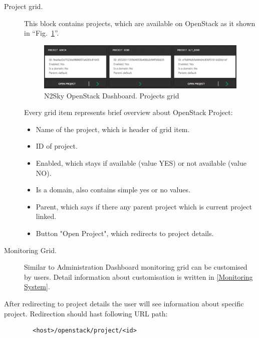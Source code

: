 \begin{description}
\item[Project grid.] This block contains projects, which are available on OpenStack as it shown in ``Fig.~\ref{fig:openstack_dashboard_projects}''.

\begin{figure}[htbp]
\begin{center}
  \includegraphics[width=\linewidth]{components/4/pics/openstack_dashboard_projects.png}
  \caption{N2Sky OpenStack Dashboard. Projects grid}
  \label{fig:openstack_dashboard_projects}
\end{center}
\end{figure}

Every grid item represents brief overview about OpenStack Project:

\begin{itemize}
\item Name of the project, which is header of grid item.
\item ID of project.
\item Enabled, which stays if available (value YES) or not available (value NO).
\item Is a domain, also contains simple yes or no values.
\item Parent, which says if there any parent project which is current project linked.
\item Button "Open Project", which redirects to project details.
\end{itemize}

\item[Monitoring Grid.] Similar to Administration Dashboard monitoring grid can be customised by users. Detail information about customisation is written in \autoref{Monitoring System}. 

\end{description}

After redirecting to project details the user will see information about specific project. Redirection should hast following URL path: 
\begin{lstlisting}
		<host>/openstack/project/<id>
\end{lstlisting}

